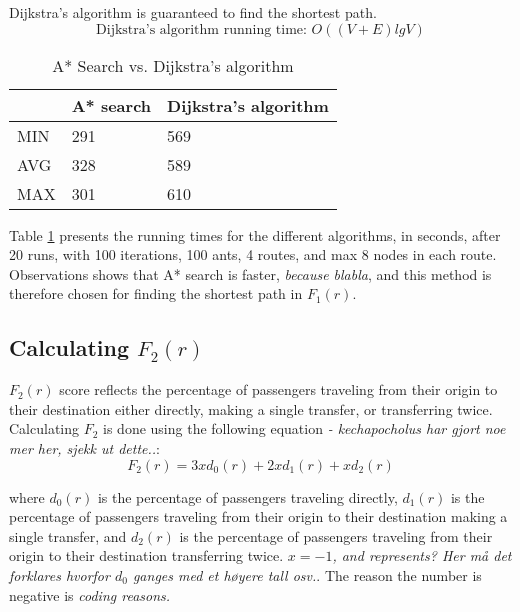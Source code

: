 Dijkstra's algorithm is guaranteed to find the shortest path\cite[p.~661]{cormen09}.
$$\text{Dijkstra's algorithm running time: } O((V + E)lg V)$$

\begin{table}[H]
    \begin{center}
        \begin{tabular}{|l|l|l|}
      \hline
      ~ & A* search & Dijkstra's algorithm\\
      \hline
        MIN & 291 & 569 \\
        AVG & 328 & 589 \\
        MAX & 301 & 610 \\
      \hline
        \end{tabular}
    \end{center}
    \caption {A* Search vs. Dijkstra's algorithm}
    \label{table:astarvsdijkstras}
\end{table}

Table \ref{table:astarvsdijkstras} presents the running times for the different algorithms, in seconds, after 20 runs, with 100 iterations, 100 ants, 4 routes,  and max 8 nodes in each route. Observations shows that A* search is faster, \emph{\color{red} because blabla}, and this method is therefore chosen for finding the shortest path in $F_1(r)$.
 

\subsection{Calculating $F_{2}(r)$}
$F_{2}(r)$ score reflects the percentage of passengers traveling from their origin to their destination either directly, making a single transfer, or transferring twice. Calculating $F_{2}$ is done using the following equation \emph{\color{red} -  kechapocholus har gjort noe mer her, sjekk ut dette..}:
$$F_2(r) = 3xd_0(r)+ 2xd_1(r)+ xd_2(r) $$

where  $d_0(r)$ is the percentage of passengers traveling directly, $d_1(r)$ is the percentage of passengers traveling from their origin to their destination making a single transfer, and $d_2(r)$ is the percentage of passengers traveling from their origin to their destination transferring twice. \emph{\color{red}$x=-1$, and represents? Her må det forklares hvorfor $d_0$ ganges med et høyere tall osv.}. The reason the number is negative is \emph{\color{red}coding reasons. } 

